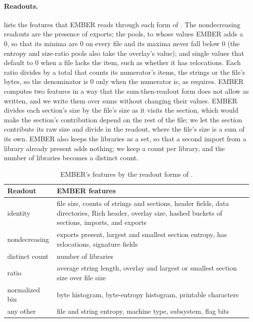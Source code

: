\paragraph{Readouts.}  lists the features that EMBER reads through each form of
. The nondecreasing readouts are the presence of exports; the pools, to whose values EMBER adds a 0, so
that its minima are 0 on every file and its maxima never fall below 0 (the entropy and size-ratio pools also take the
overlay's value); and single values that default to 0 when a file lacks the item, such as whether it has
relocations. Each ratio divides by a total that counts its numerator's items, the strings or the file's bytes, so the
denominator is 0 only when the numerator is, as  requires. EMBER computes two features in a way
that the sum-then-readout form does not allow as written, and we write them over sums
without changing their values. EMBER divides each section's size by the file's size as it visits
the section, which would make the section's contribution depend on the rest of the file; we let the section
contribute its raw size and divide in the readout, where the file's size is a sum of its own. EMBER also keeps the
libraries as a set, so that a second import from a library already present adds nothing; we keep a count per library,
and the number of libraries becomes a distinct count.

\begin{table}[h]
  \caption{EMBER's features by the readout forms of .}
  \label{tab:ember:readouts}
  \small
  \begin{tabular}{@{}lp{}@{}}
    \toprule
    Readout & EMBER features \\
    \midrule
    identity & file size, counts of strings and sections, header fields, data directories, Rich header, overlay size,
      hashed buckets of sections, imports, and exports \\
    nondecreasing & exports present, largest and smallest section entropy, has relocations, signature fields \\
    distinct count & number of libraries \\
    ratio & average string length, overlay and largest or smallest section size over file size \\
    normalized bin & byte histogram, byte-entropy histogram, printable characters \\
    any other & file and string entropy, machine type, subsystem, flag bits \\
    \bottomrule
  \end{tabular}
\end{table}

